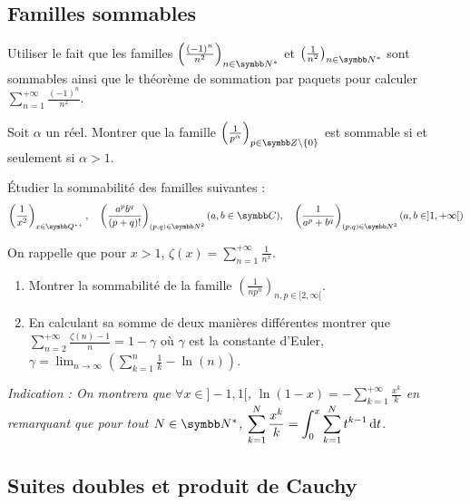 \subsection{Familles sommables}

\begin{exercice}
    Utiliser le fait que les familles $\left(\frac{(-1)^{n}}{n^{2}}\right)_{n\in \N^{*}}$ et $\left(\frac{1}{n^{2}}\right)_{n\in \N^{*}}$ 
    sont sommables ainsi que le théorème de sommation par paquets pour calculer $\displaystyle \sum_{n=1}^{+\infty}\frac{(-1)^{n}}{n^{2}}$.
\end{exercice}

\begin{exercice}
    Soit $\alpha$ un réel. Montrer que la famille $\left(\frac{1}{p^{\alpha}}\right)_{p\in \Z\setminus\{0\}}$ est sommable si et seulement si $\alpha>1$.
\end{exercice}

\begin{exercice}
    Étudier la sommabilité des familles suivantes :
    \[\left(\frac{1}{x^{2}}\right)_{x\in \Q^{*+}}, \quad \left(\frac{a^{p}b^{q}}{(p+q)!}\right)_{(p,q)\in \N^{2}}(a,b\in\C), \quad \left(\frac{1}{a^{p}+b^{q}}\right)_{(p,q)\in \N^{2}}(a,b\in]1,+\infty[)\]
\end{exercice}

\begin{exercice}
    On rappelle que pour $x>1$, $\displaystyle \zeta(x)=\sum_{n=1}^{+\infty}\frac{1}{n^{x}}$.
    \begin{enumerate}
        \item Montrer la sommabilité de la famille $\left(\frac{1}{np^{n}}\right)_{n,p\in[2,\infty[}$.
        \item En calculant sa somme de deux manières différentes montrer que 
            $\displaystyle \sum_{n=2}^{+\infty}\frac{\zeta(n)-1}{n}=1-\gamma$ où $\gamma$ est la constante d'Euler,
            $\displaystyle \gamma=\lim_{n\rightarrow\infty}\left(\sum_{k=1}^{n}\frac{1}{k}-\ln(n) \right)$.
    \end{enumerate}
    \textit{Indication : On montrera que $\forall x\in]-1,1[$, $\displaystyle \ln(1-x)=-\sum_{k=1}^{+\infty}\frac{x^{k}}{k}$ 
        en remarquant que pour tout $N \in \N^*$, $\displaystyle \sum_{k=1}^{N}\frac{x^{k}}{k}=\int_{0}^{x}\sum_{k=1}^{N}t^{k-1} \,\mathrm{d}t$.}
\end{exercice}

\subsection{Suites doubles et produit de Cauchy}

